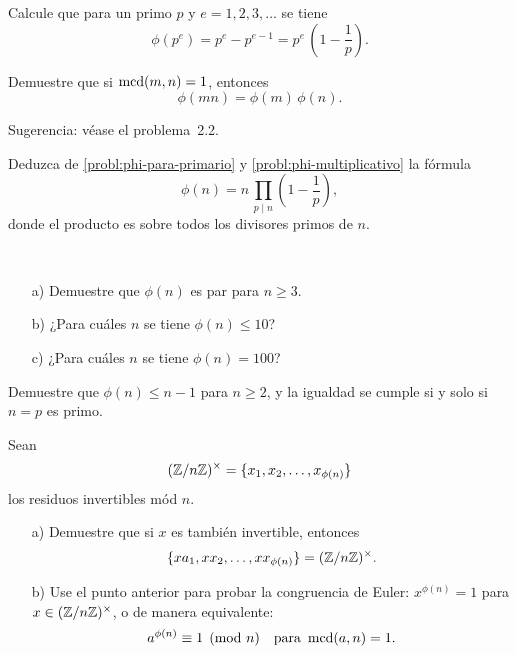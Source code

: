 \documentclass{article}
\begin{document}
\begin{problema}
  \label{probl:phi-para-primario}
  Calcule que para un primo $p$ y $e = 1,2,3,\ldots$ se tiene
  $$\phi (p^e) = p^e - p^{e-1} = p^e\,\left(1 - \frac{1}{p}\right).$$
\end{problema}

\begin{problema}[Multiplicatividad]
  \label{probl:phi-multiplicativo}
  Demuestre que si $\operatorname{mcd} (m,n) = 1$, entonces
  $$\phi (mn) = \phi(m)\,\phi(n).$$

  Sugerencia: véase el problema~2.2.
\end{problema}

\begin{problema}
  Deduzca de \ref{probl:phi-para-primario} y \ref{probl:phi-multiplicativo} la
  fórmula
  $$\phi (n) = n\,\prod_{p \mid n} \left(1 - \frac{1}{p}\right),$$
  donde el producto es sobre todos los divisores primos de $n$.
\end{problema}

\begin{problema}
  ~

  \begin{itemize}
  \item[a)] Demuestre que $\phi(n)$ es par para $n \ge 3$.

  \item[b)] ¿Para cuáles $n$ se tiene $\phi (n) \le 10$?

  \item[c)] ¿Para cuáles $n$ se tiene $\phi (n) = 100$?
  \end{itemize}
\end{problema}

\begin{problema}
  Demuestre que $\phi (n) \le n-1$ para $n \ge 2$, y la igualdad se cumple si y
  solo si $n = p$ es primo.
\end{problema}

\begin{problema}
  \label{probl:congruencia-de-euler}
  Sean
  \[ (\mathbb{Z}/n\mathbb{Z})^\times = \{ x_1, x_2, \ldots, x_{\phi (n)} \} \]
  los residuos invertibles mód $n$.

  \begin{enumerate}
  \item[a)] Demuestre que si $x$ es también invertible, entonces
    $$\{ x a_1, x x_2, \ldots, x x_{\phi (n)} \} = (\mathbb{Z}/n\mathbb{Z})^\times.$$

  \item[b)] Use el punto anterior para probar la congruencia de Euler:
    $x^{\phi(n)} = 1$ para $x \in (\mathbb{Z}/n\mathbb{Z})^\times$,
    o de manera equivalente:
    $$a^{\phi (n)} \equiv 1 \pmod{n} \quad \text{para }\operatorname{mcd} (a,n) = 1.$$
  \end{enumerate}
\end{problema}
\end{document}

